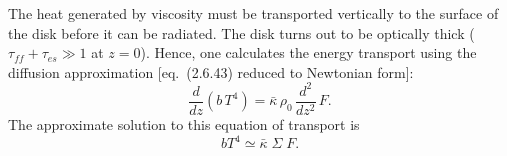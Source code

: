 The heat generated by viscosity must be transported vertically to the surface of
the disk before it can be radiated. The disk turns out to be optically thick
($\tau_{ff}+\tau_{es}\gg 1$ at $z=0$). Hence, one calculates the energy transport using the
diffusion approximation [eq.~(2.6.43) reduced to Newtonian form]:
\begin{equation}
\frac{d}{dz}\!\left(b\,T^4\right) = \bar{\kappa}\,\rho_0\,\frac{d^2}{dz^2}\,F.
\tag{5.2.34}
\end{equation}
The approximate solution to this equation of transport is
\begin{equation}
bT^4 \simeq \bar{\kappa}\;\Sigma\; F.
\tag{5.2.35}
\end{equation}

